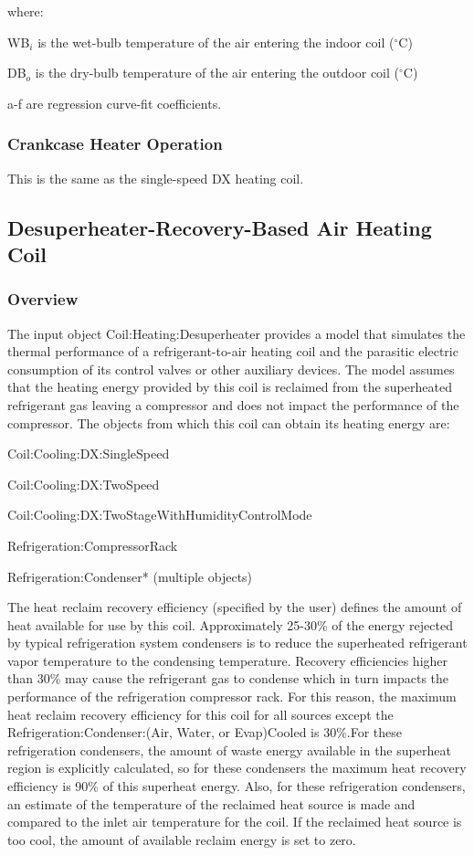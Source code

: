 where:

WB\(_{i}\) is the wet-bulb temperature of the air entering the indoor coil (\(^{\circ}\)C)

DB\(_{o}\) is the dry-bulb temperature of the air entering the outdoor coil (\(^{\circ}\)C)

a-f are regression curve-fit coefficients.

\subsubsection{Crankcase Heater Operation}\label{crankcase-heater-operation}

This is the same as the single-speed DX heating coil.

\subsection{Desuperheater-Recovery-Based Air Heating Coil}\label{desuperheater-recovery-based-air-heating-coil}

\subsubsection{Overview}\label{overview-9}

The input object Coil:Heating:Desuperheater provides a model that simulates the thermal performance of a refrigerant-to-air heating coil and the parasitic electric consumption of its control valves or other auxiliary devices. The model assumes that the heating energy provided by this coil is reclaimed from the superheated refrigerant gas leaving a compressor and does not impact the performance of the compressor. The objects from which this coil can obtain its heating energy are:

Coil:Cooling:DX:SingleSpeed

Coil:Cooling:DX:TwoSpeed

Coil:Cooling:DX:TwoStageWithHumidityControlMode

Refrigeration:CompressorRack

Refrigeration:Condenser* (multiple objects)

The heat reclaim recovery efficiency (specified by the user) defines the amount of heat available for use by this coil. Approximately 25-30\% of the energy rejected by typical refrigeration system condensers is to reduce the superheated refrigerant vapor temperature to the condensing temperature. Recovery efficiencies higher than 30\% may cause the refrigerant gas to condense which in turn impacts the performance of the refrigeration compressor rack. For this reason, the maximum heat reclaim recovery efficiency for this coil for all sources except the Refrigeration:Condenser:(Air, Water, or Evap)Cooled is 30\%.For these refrigeration condensers, the amount of waste energy available in the superheat region is explicitly calculated, so for these condensers the maximum heat recovery efficiency is 90\% of this superheat energy. Also, for these refrigeration condensers, an estimate of the temperature of the reclaimed heat source is made and compared to the inlet air temperature for the coil. If the reclaimed heat source is too cool, the amount of available reclaim energy is set to zero.

